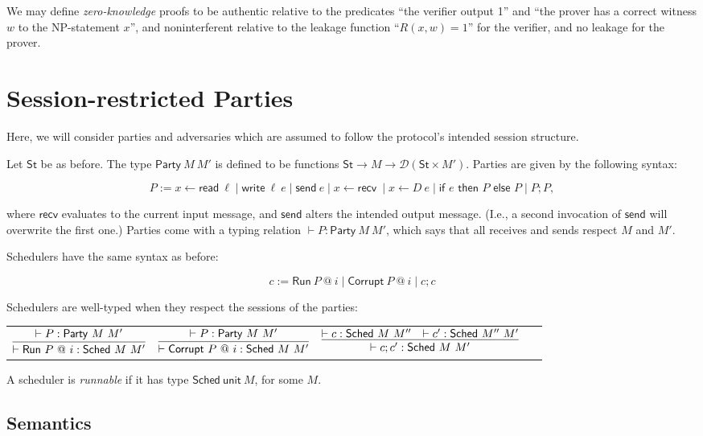 \documentclass{article}
\newcommand{\St}{\mathsf{St}}
\newcommand{\D}{\mathcal{D}}
\newcommand{\Read}{\mathsf{read}}
\newcommand{\Write}{\mathsf{write}}
\newcommand{\send}{\mathsf{send}}
\newcommand{\recv}{\mathsf{recv}}
\begin{document}
We may define \emph{zero-knowledge} proofs to be authentic relative to the predicates ``the verifier output 1'' and ``the prover has a correct witness $w$ to the NP-statement $x$'', and noninterferent relative to the leakage function ``$R(x,w) = 1$'' for the verifier, and no leakage for the prover. 


\section{Session-restricted Parties}

Here, we will consider parties and adversaries which are assumed to follow the protocol's intended session structure. 

Let $\St$ be as before. The type $\mathsf{Party}\ M\ M'$ is defined to be functions $\St \to M \to \D(\St \times M')$. Parties are given by the following syntax:

\[ P := x \leftarrow \Read\ \ell \mid \Write\ \ell\ e \mid \send\ e \mid x \leftarrow \recv\ \mid x \leftarrow D\ e \mid \textsf{if } e \textsf{ then } P \textsf{ else } P \mid P; P, \]

where $\recv$ evaluates to the current input message, and $\send$ alters the intended output message. (I.e., a second invocation of $\send$ will overwrite the first one.) Parties come with a typing relation $\vdash P : \mathsf{Party}\ M\ M'$, which says that all receives and sends respect $M$ and $M'$.


Schedulers have the same syntax as before:

\[ c := \textsf{Run}\ P\ @\ i \mid \textsf{Corrupt}\ P\ @\ i \mid c; c\]

Schedulers are well-typed when they respect the sessions of the parties:

    \begin{tabular}{cccc}
        $\infer{\vdash \textsf{Run}\ P\ @\ i : \textsf{Sched}\ M\ M'}{\vdash P : \mathsf{Party}\ M\ M'}$ &
        $\infer{\vdash \textsf{Corrupt}\ P\ @\ i : \textsf{Sched}\ M\ M'}{\vdash P : \mathsf{Party}\ M\ M'}$ &
        $\infer{\vdash c; c' : \textsf{Sched}\ M\ M'}{\vdash c : \textsf{Sched}\ M\ M'' & \vdash c' : \textsf{Sched}\ M''\ M'}$ &
        \ \\
    \end{tabular}

A scheduler is \emph{runnable} if it has type $\textsf{Sched}\ \textsf{unit}\ M$, for some $M$.

\subsection{Semantics}
\end{document}
